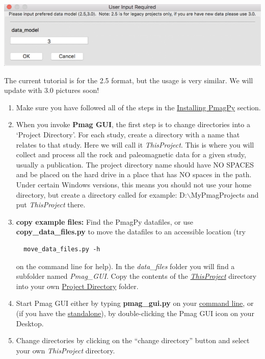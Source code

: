 \documentclass[11pt]{book}
\begin{document}
{\includegraphics[width=15cm]{EPSFiles/PmagGUI_choose_data_model.eps}

The current tutorial is for the 2.5 format, but the usage is very similar.  We will update with 3.0 pictures soon!

\begin{enumerate}
\item Make sure you have followed all of the steps in the \href{#quick_start}{Installing PmagPy} section.


\item  When you invoke {\bf Pmag GUI}, the first step is to change directories into a  `Project Directory'. For each study, create a directory with a name that relates to that study. Here we will call it {\it ThisProject}.  This is where you will collect and process all the rock and paleomagnetic data for a given study, usually a publication. The project directory name should have NO SPACES and be placed on the hard drive in a place that has NO spaces in the path. Under certain Windows versions, this means you should not use your home directory, but create a directory called for example: D:$\backslash$MyPmagProjects and put {\it ThisProject} there.
%
%
%


\item \textbf{copy example files:}  Find the PmagPy datafiles, or use \textbf{copy\_data\_files.py} to move the  datafiles to an accessible location (try \begin{verbatim}
  move_data_files.py -h\end{verbatim} on the command line for help).  In the {\it data\_files } folder you will find a subfolder named {\it Pmag\_GUI}. Copy the contents of the  \href{#Project_Directory}{\it ThisProject} directory  into  your  own \href{#Project_Directory}{Project Directory} folder.
 \item Start Pmag GUI either by typing {\bf pmag\_gui.py} on your \href{#command_line}{command line}, or (if you have the \href{#standalone}{standalone}), by double-clicking the Pmag GUI icon on your Desktop.
 \item Change directories by clicking  on the ``change directory'' button and select your own {\it ThisProject} directory.
 \end{enumerate}

}
\end{document}
